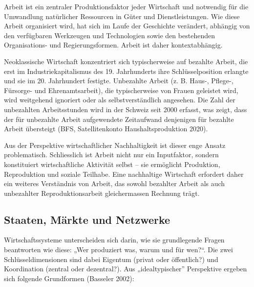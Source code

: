 \documentclass[
  nswissgerman,
  a4paper,
  openany]{book}
\begin{document}
\begin{tcolorbox}[enhanced jigsaw, arc=.35mm, bottomrule=.15mm, bottomtitle=1mm, breakable, colback=white, colbacktitle=quarto-callout-note-color!10!white, colframe=quarto-callout-note-color-frame, coltitle=black, left=2mm, leftrule=.75mm, opacityback=0, opacitybacktitle=0.6, rightrule=.15mm, title={Arbeit ist mehr als bezahlte Arbeit}, titlerule=0mm, toprule=.15mm, toptitle=1mm]

Arbeit ist ein zentraler Produktionsfaktor jeder Wirtschaft und
notwendig für die Umwandlung natürlicher Ressourcen in Güter und
Dienstleistungen. Wie diese Arbeit organisiert wird, hat sich im Laufe
der Geschichte verändert, abhängig von den verfügbaren Werkzeugen und
Technologien sowie den bestehenden Organisations- und Regierungsformen.
Arbeit ist daher kontextabhängig.

Neoklassische Wirtschaft konzentriert sich typischerweise auf bezahlte
Arbeit, die erst im Industriekapitalismus des 19. Jahrhunderts ihre
Schlüsselposition erlangte und sie im 20. Jahrhundert festigte.
Unbezahlte Arbeit (z. B. Haus-, Pflege-, Fürsorge- und Ehrenamtsarbeit),
die typischerweise von Frauen geleistet wird, wird weitgehend ignoriert
oder als selbstverständlich angesehen. Die Zahl der unbezahlten
Arbeitsstunden wird in der Schweiz seit 2000 erfasst, was zeigt, dass
der für unbezahlte Arbeit aufgewendete Zeitaufwand denjenigen für
bezahlte Arbeit übersteigt (BFS, Satellitenkonto Haushaltsproduktion
2020).

Aus der Perspektive wirtschaftlicher Nachhaltigkeit ist dieser enge
Ansatz problematisch. Schliesslich ist Arbeit nicht nur ein Inputfaktor,
sondern konstituiert wirtschaftliche Aktivität selbst -- sie ermöglicht
Produktion, Reproduktion und soziale Teilhabe. Eine nachhaltige
Wirtschaft erfordert daher ein weiteres Verständnis von Arbeit, das
sowohl bezahlter Arbeit als auch unbezahlter Reproduktionsarbeit
gleichermassen Rechnung trägt.

\end{tcolorbox}

\subsection{Staaten, Märkte und
Netzwerke}\label{staaten-muxe4rkte-und-netzwerke}

Wirtschaftssysteme unterscheiden sich darin, wie sie grundlegende Fragen
beantworten wie diese: „Wer produziert was, warum und für wen?``. Die
zwei Schlüsseldimensionen sind dabei Eigentum (privat oder öffentlich?)
und Koordination (zentral oder dezentral?). Aus „idealtypischer''
Perspektive ergeben sich folgende Grundformen (Basseler 2002):
\end{document}

